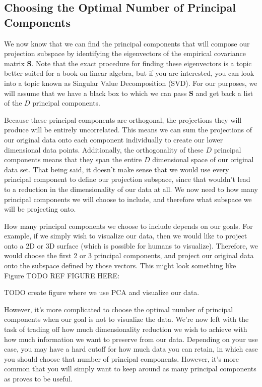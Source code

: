 \subsection{Choosing the Optimal Number of Principal Components}
We now know that we can find the principal components that will compose our projection subspace by identifying the eigenvectors of the empirical covariance matrix $\textbf{S}$. Note that the exact procedure for finding these eigenvectors is a topic better suited for a book on linear algebra, but if you are interested, you can look into a topic known as Singular Value Decomposition (SVD). For our purposes, we will assume that we have a black box to which we can pass $\textbf{S}$ and get back a list of the $D$ principal components.

Because these principal components are orthogonal, the projections they will produce will be entirely uncorrelated. This means we can sum the projections of our original data onto each component individually to create our lower dimensional data points. Additionally, the orthogonality of these $D$ principal components means that they span the entire $D$ dimensional space of our original data set. That being said, it doesn't make sense that we would use every principal component to define our projection subspace, since that wouldn't lead to a reduction in the dimensionality of our data at all. We now need to how many principal components we will choose to include, and therefore what subspace we will be projecting onto.

How many principal components we choose to include depends on our goals. For example, if we simply wish to visualize our data, then we would like to project onto a 2D or 3D surface (which is possible for humans to visualize). Therefore, we would choose the first 2 or 3 principal components, and project our original data onto the subspace defined by those vectors. This might look something like Figure TODO REF FIGURE HERE:

TODO create figure where we use PCA and visualize our data.

However, it's more complicated to choose the optimal number of principal components when our goal is not to visualize the data. We're now left with the task of trading off how much dimensionality reduction we wish to achieve with how much information we want to preserve from our data. Depending on your use case, you may have a hard cutoff for how much data you can retain, in which case you should choose that number of principal components. However, it's more common that you will simply want to keep around as many principal components as proves to be useful.

